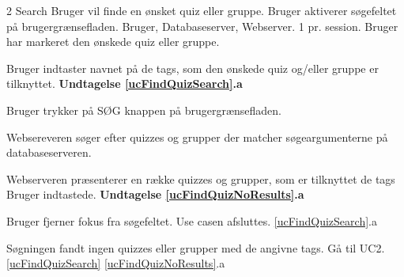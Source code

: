 \uchead
	{2}
	{Search}
	{Bruger vil finde en ønsket quiz eller gruppe.}
	{Bruger aktiverer søgefeltet på brugergrænsefladen.}
	{Bruger, Databaseserver, Webserver.}
	{} %
	{}
	{1 pr. session.}
	{Bruger har markeret den ønskede quiz eller gruppe.}

\item \label{ucFindQuizSearch} Bruger indtaster navnet på de tags, som den ønskede quiz og/eller gruppe er tilknyttet. 
\textbf{Undtagelse \ref{ucFindQuizSearch}.a}
\item Bruger trykker på SØG knappen på brugergrænsefladen.
\item Websereveren søger efter quizzes og grupper der matcher søgeargumenterne på databaseserveren.

\item \label{ucFindQuizNoResults} Webserveren præsenterer en række quizzes og grupper, som er tilknyttet de tags Bruger indtastede.
\textbf{Undtagelse \ref{ucFindQuizNoResults}.a}


\ucdescriptionend

\ucextension
	{Bruger fjerner fokus fra søgefeltet.}
	{Use casen afsluttes.}
	{\ref{ucFindQuizSearch}.a}

\ucextension
	{Søgningen fandt ingen quizzes eller grupper med de angivne tags.}
	{Gå til UC2.\ref{ucFindQuizSearch}}
	{\ref{ucFindQuizNoResults}.a}
				
